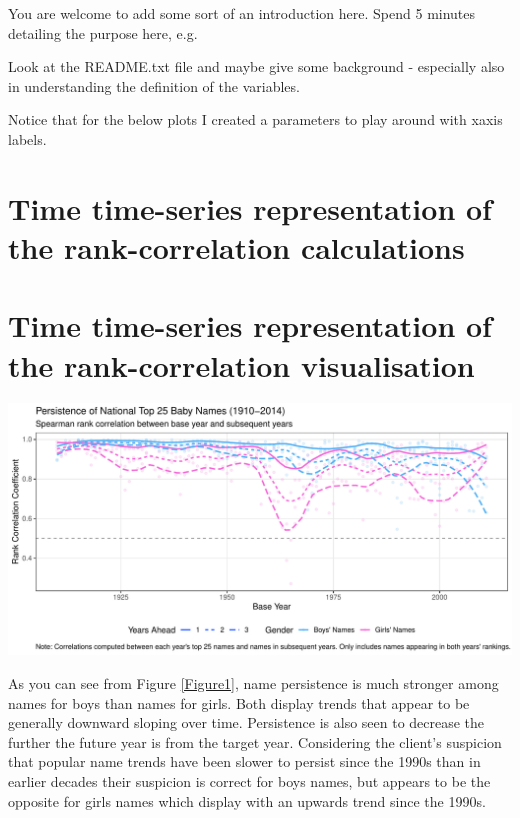 \documentclass[11pt,preprint]{elsarticle}
\let\origfigure\figure
\let\endorigfigure\endfigure
\renewenvironment{figure}[1][2] {
    \expandafter\origfigure\expandafter[H]
} {
    \endorigfigure
}
\numberwithin{equation}{section}
\numberwithin{figure}{section}
\numberwithin{table}{section}
\begin{document}
You are welcome to add some sort of an introduction here. Spend 5
minutes detailing the purpose here, e.g.

Look at the README.txt file and maybe give some background - especially
also in understanding the definition of the variables.

Notice that for the below plots I created a parameters to play around
with xaxis labels.

\section{Time time-series representation of the rank-correlation
calculations}\label{time-time-series-representation-of-the-rank-correlation-calculations}

\section{Time time-series representation of the rank-correlation
visualisation}\label{time-time-series-representation-of-the-rank-correlation-visualisation}

\begin{figure}[H]

{\centering \includegraphics{Question1_files/figure-latex/unnamed-chunk-2-1} 

}

\caption{Persistence of National Top 25 Baby Names (1910-2014).\label{Figure1}}\label{fig:unnamed-chunk-2}
\end{figure}

As you can see from Figure \ref{Figure1}, name persistence is much
stronger among names for boys than names for girls. Both display trends
that appear to be generally downward sloping over time. Persistence is
also seen to decrease the further the future year is from the target
year. Considering the client's suspicion that popular name trends have
been slower to persist since the 1990s than in earlier decades their
suspicion is correct for boys names, but appears to be the opposite for
girls names which display with an upwards trend since the 1990s.
\end{document}

